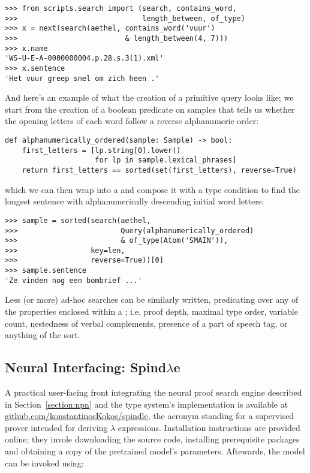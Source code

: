 \begin{verbatim}
>>> from scripts.search import (search, contains_word,
>>>                             length_between, of_type)
>>> x = next(search(aethel, contains_word('vuur')  
>>>                         & length_between(4, 7)))
>>> x.name
'WS-U-E-A-0000000004.p.28.s.3(1).xml'
>>> x.sentence
'Het vuur greep snel om zich heen .'
\end{verbatim}

\noindent And here's an example of what the creation of a primitive query looks like; we start from the creation of a boolean predicate on samples that tells us whether the opening letters of each word follow a reverse alphanumeric order:
\begin{verbatim}
def alphanumerically_ordered(sample: Sample) -> bool:
    first_letters = [lp.string[0].lower() 
                     for lp in sample.lexical_phrases]
    return first_letters == sorted(set(first_letters), reverse=True)
\end{verbatim}

\noindent which we can then wrap into a  and compose it with a type condition to find the longest sentence with alphanumerically descending initial word letters:

\begin{verbatim}
>>> sample = sorted(search(aethel, 
>>>                        Query(alphanumerically_ordered)
>>>                        & of_type(Atom('SMAIN')),
>>>                 key=len,
>>>                 reverse=True))[0]
>>> sample.sentence
'Ze vinden nog een bombrief ...'
\end{verbatim}

\noindent Less (or more) ad-hoc searches can be similarly written, predicating over any of the properties enclosed within a ; i.e. proof depth, maximal type order, variable count, nestedness of verbal complements, presence of a part of speech tag, or anything of the sort.

\subsection{Neural Interfacing: Spind$\lambda$e}
\label{subappendix:spindle}
A practical user-facing front integrating the neural proof search engine described in Section~\ref{section:npn} and the type system's implementation is available at 
\href{https://github.com/konstantinosKokos/spindle}{github.com/konstantinosKokos/spindle}, the acronym standing for a supervised prover intended for deriving $\lambda$ expressions.
Installation instructions are provided online; they invole downloading the source code, installing prerequisite packages and obtaining a copy of the pretrained model's parameters.
Aftewards, the model can be invoked using:


